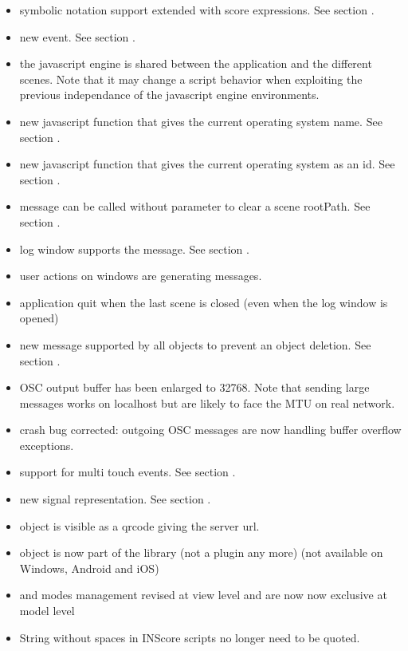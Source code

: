 
\begin{itemize}
\item symbolic notation support extended with score expressions. See section .
\item new  event. See section .
\item the javascript engine is shared between the application and the different scenes.
  Note that it may change a script behavior when exploiting the previous independance
  of the javascript engine environments.
\item new javascript  function that gives the current operating system name. See section .
\item new javascript  function that gives the current operating system as an id. See section .
\item {} message can be called without parameter to clear a scene rootPath. See section .
\item log window supports the  message. See section .
\item user actions on windows are generating  messages.
\item application quit when the last scene is closed (even when the log window is opened) 
\item new  message supported by all objects to prevent an object deletion. See section .
\item OSC output buffer has been enlarged to 32768. Note that sending large messages works on localhost but are likely to face the MTU on real network. 
\item crash bug corrected: outgoing OSC messages are now handling buffer overflow exceptions.

\item support for multi touch events. See section .
\item new  signal representation. See section .
\item {} object is visible as a qrcode giving the server url.
\item {} object is now part of the library (not a plugin any more) (not available on Windows, Android and iOS)
\item {} and  modes management revised at view level and are now now exclusive at model level
\item String without spaces in INScore scripts no longer need to be quoted.
\end{itemize}


